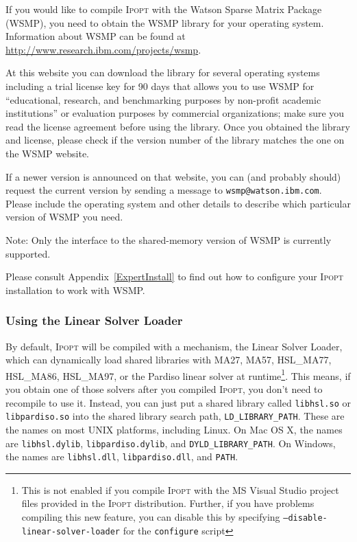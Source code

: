 \documentclass[10pt]{article}
\newcommand{\Ipopt}{\textsc{Ipopt}\xspace}
\begin{document}
If you would like to compile \Ipopt with the Watson Sparse Matrix
Package (WSMP), you need to obtain the WSMP library for your operating
system.  Information about WSMP can be found at
\url{http://www.research.ibm.com/projects/wsmp}.

At this website you can download the library for several operating systems
including a trial license key for 90 days that allows you to use WSMP
for ``educational, research, and benchmarking purposes by
non-profit academic institutions'' or evaluation purposes by commercial
organizations;
make sure you read the license agreement before using the library.
Once you obtained the library and license, please check if the version
number of the library matches the one on the WSMP website.

If a newer version is announced on that website, you can (and
probably should) request the current version by sending a message to
\verb|wsmp@watson.ibm.com|.  Please include the operating system and
other details to describe which particular version of WSMP you need.


Note: Only the interface to the shared-memory version of WSMP is
currently supported.

Please consult Appendix~\ref{ExpertInstall} to find out how to
configure your \Ipopt installation to work with WSMP.

\subsubsection{Using the Linear Solver Loader}\label{sec:linear_solver_loader}
By default, \Ipopt will be compiled with a mechanism, the Linear
Solver Loader, which can dynamically load shared libraries with MA27,
MA57, HSL\_MA77, HSL\_MA86, HSL\_MA97, or the Pardiso linear solver at 
runtime\footnote{This is not
  enabled if you compile \Ipopt with the MS Visual Studio project files
  provided in the \Ipopt distribution.  Further, if you have problems
  compiling this new feature, you can disable this by specifying
  \texttt{--disable-linear-solver-loader} for the \texttt{configure}
  script}. This means, if you obtain one of those solvers after you
compiled \Ipopt, you don't need to recompile to
use it.  Instead, you can just put a shared library called
\texttt{libhsl.so} or \texttt{libpardiso.so} into the shared library
search path, \texttt{LD\_LIBRARY\_PATH}.  These are the names on most
UNIX platforms, including Linux.  On Mac OS X, the names are
\texttt{libhsl.dylib}, \texttt{libpardiso.dylib}, and
\texttt{DYLD\_LIBRARY\_PATH}.  On Windows, the names are \texttt{libhsl.dll},
\texttt{libpardiso.dll}, and \texttt{PATH}.
\end{document}

